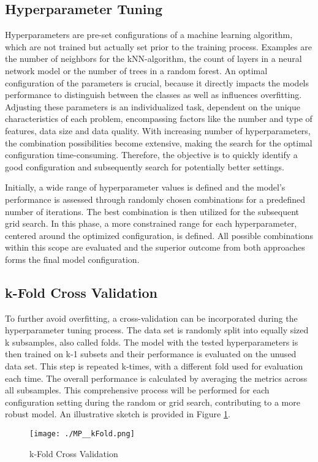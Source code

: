 \subsection{Hyperparameter Tuning}
Hyperparameters are pre-set configurations of a machine learning algorithm, which are not trained but actually set prior to the training process. Examples are the number of neighbors for the kNN-algorithm, the count of layers in a neural network model or the number of trees in a random forest. An optimal configuration of the parameters is crucial, because it directly impacts the models performance to distinguish between the classes as well as influences overfitting. Adjusting these parameters is an individualized task, dependent on the unique characteristics of each problem, encompassing factors like the number and type of features, data size and data quality. With increasing number of hyperparameters, the combination possibilities become extensive, making the search for the optimal configuration time-consuming. Therefore, the objective is to quickly identify a good configuration and subsequently search for potentially better settings.

Initially, a wide range of hyperparameter values is defined and the model's performance is assessed through randomly chosen combinations for a predefined number of iterations. The best combination is then utilized for the subsequent grid search. In this phase, a more constrained range for each hyperparameter, centered around the optimized configuration, is defined. All possible combinations within this scope are evaluated and the superior outcome from both approaches forms the final model configuration. \cite[p.~465]{Python:2022} \cite{RanFor:2023}

\subsection{k-Fold Cross Validation}
To further avoid overfitting, a cross-validation can be incorporated during the hyperparameter tuning process. The data set is randomly split into equally sized k subsamples, also called folds. The model with the tested hyperparameters is then trained on k-1 subsets and their performance is evaluated on the unused data set. This step is repeated k-times, with a different fold used for evaluation each time. The overall performance is calculated by averaging the metrics across all subsamples. This comprehensive process will be performed for each configuration setting during the random or grid search, contributing to a more robust model. An illustrative sketch is provided in Figure \ref{fig:re_wholesample}. \cite[p.~470]{Python:2022}

\begin{figure}[H]
	\centering
	\texttt{[image: ./MP\_\_kFold.png]}
    \caption{k-Fold Cross Validation}
    \label{fig:re_wholesample}
\end{figure}